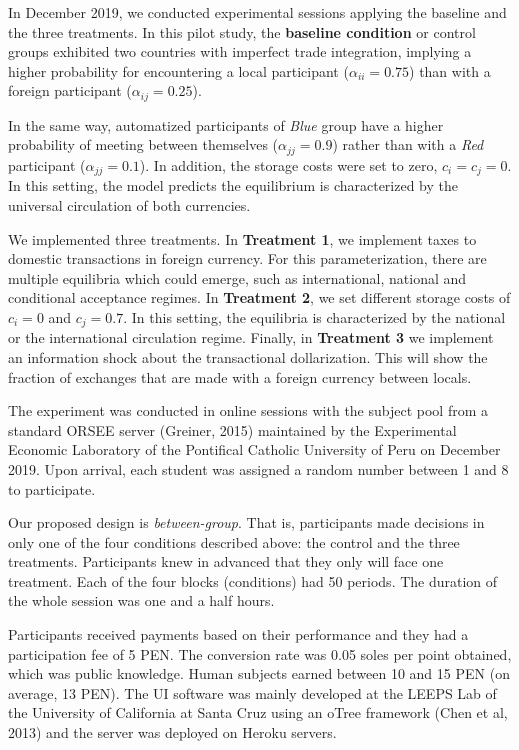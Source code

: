 In December 2019, we conducted experimental sessions applying the baseline and the three treatments. In this pilot study, the \textbf{baseline condition} or control groups exhibited two countries with imperfect trade integration, implying a higher probability for encountering a local participant ($\alpha_{ii} = 0.75$) than with a foreign participant ($\alpha_{ij} = 0.25$). 

In the same way, automatized participants of \textit{Blue} group have a higher probability of meeting between themselves ($\alpha_{jj}=0.9$) rather than with a \textit{Red} participant ($\alpha_{jj}=0.1$). In addition, the storage costs were set to zero, $c_i = c_j = 0$. In this setting, the model predicts the equilibrium is characterized by the universal circulation of both currencies. 

We implemented three treatments. In \textbf{Treatment 1}, we implement taxes to domestic transactions in foreign currency. For this parameterization, there are multiple equilibria which could emerge, such as international, national and conditional acceptance regimes. In \textbf{Treatment 2}, we set different storage costs of $c_i = 0$ and $c_j = 0.7$. In this setting, the equilibria is characterized by the national or the international circulation regime. Finally, in \textbf{Treatment 3} we implement an information shock about the transactional dollarization. This will show the fraction of exchanges that are made with a foreign currency between locals.



The experiment was conducted in online sessions with the subject pool from a standard ORSEE server (Greiner, 2015) maintained by the Experimental Economic Laboratory of the Pontifical Catholic University of Peru on December 2019. Upon arrival, each student was assigned a random number between 1 and 8 to participate. 

Our proposed design is \textit{between-group}. That is, participants made decisions in only one of the four conditions described above: the control and the three treatments. Participants knew in advanced that they only will face one treatment. Each of the four blocks (conditions) had 50 periods. The duration of the whole session was one and a half hours. 

Participants received payments based on their performance and they had a participation fee of 5 PEN. The conversion rate was 0.05 soles per point obtained, which was public knowledge. Human subjects earned between 10 and 15 PEN (on average, 13 PEN). The UI software was mainly developed at the LEEPS Lab of the University of California at Santa Cruz using an oTree framework (Chen et al, 2013) and the server was deployed on Heroku servers. 

